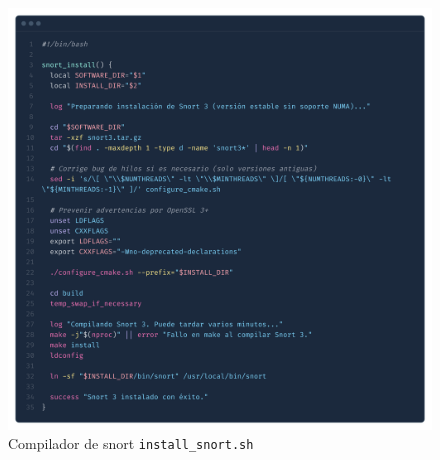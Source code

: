 \documentclass[12pt,a4paper]{report}
\begin{document}
\begin{figure}[H]
	\centering
	\includegraphics[scale=0.12]{script_automatico/6.png}
	\caption{Compilador de snort \texttt{install\_snort.sh}}
	\label{fig:install-snort}
\end{figure}
\end{document}
